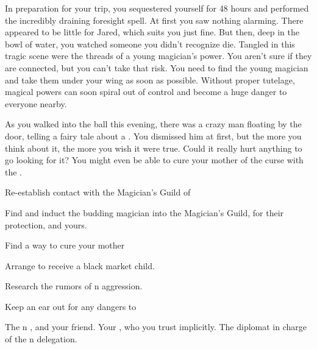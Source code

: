 \documentclass[char]{NeptuneBall}
\begin{document}
In preparation for your trip, you sequestered yourself for 48 hours and performed the incredibly draining foresight spell. At first you saw nothing alarming. There appeared to be little for Jared, which suits you just fine. But then, deep in the bowl of water, you watched someone you didn't recognize die. Tangled in this tragic scene were the threads of a young magician's power. You aren't sure if they are connected, but you can't take that risk. You need to find the young magician and take them under your wing as soon as possible. Without proper tutelage, magical powers can soon spiral out of control and become a huge danger to everyone nearby.

As you walked into the ball this evening, there was a crazy man floating by the door, telling a fairy tale about a \iWishingStone{\MYname}. You dismissed him at first, but the more you think about it, the more you wish it were true. Could it really hurt anything to go looking for it? You might even be able to cure your mother of the curse with the \iWishingStone{\MYname}.

\begin{itemz}[Goals]
  \item Re-establish contact with the Magician's Guild of \pAtlantis{}
  \item Find and induct the budding magician into the Magician's Guild, for their protection, and yours.
  \item Find a way to cure your mother
  \item Arrange to receive a black market child.
  \item Research the rumors of \pIndia{}n aggression.
  \item Keep an ear out for any dangers to \cPrince{}
\end{itemz}

\begin{contacts}
  \contact{\cPrince{}} The \pPacifica{}n \cPrince{\Prince}, and your friend.
  \contact{\cSpy{}} Your \cSpy{\sibling}, who you trust implicitly.
  \contact{\cDiplomat{}} The diplomat in charge of the \pPacifica{}n delegation.
\end{contacts}
\end{document}
